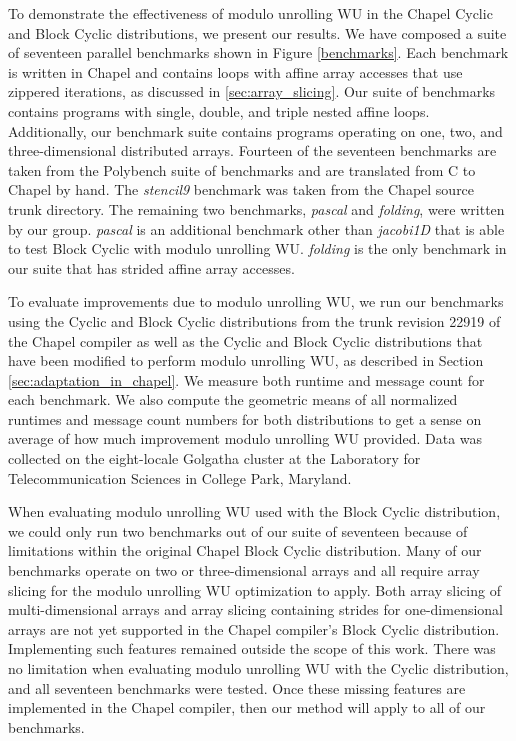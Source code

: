 To demonstrate the effectiveness of modulo unrolling WU in the Chapel Cyclic and Block Cyclic distributions, we present our results. We have composed a suite of seventeen parallel benchmarks shown in Figure \ref{benchmarks}. Each benchmark is written in Chapel and contains loops with affine array accesses that use zippered iterations, as discussed in \ref{sec:array_slicing}. Our suite of benchmarks contains programs with single, double, and triple nested affine loops. Additionally, our benchmark suite contains programs operating on one, two, and three-dimensional distributed arrays. Fourteen of the seventeen benchmarks are taken from the Polybench suite of benchmarks \cite{polybench} and are translated from C to Chapel by hand. The \textit{stencil9} benchmark was taken from the Chapel source trunk directory. The remaining two benchmarks, \textit{pascal} and \textit{folding}, were written by our group. \textit{pascal} is an additional benchmark other than \textit{jacobi1D} that is able to test Block Cyclic with modulo unrolling WU. \textit{folding} is the only benchmark in our suite that has strided affine array accesses. 

To evaluate improvements due to modulo unrolling WU, we run our benchmarks using the Cyclic and Block Cyclic distributions from the trunk revision 22919 of the Chapel compiler as well as the Cyclic and Block Cyclic distributions that have been modified to perform modulo unrolling WU, as described in Section \ref{sec:adaptation_in_chapel}. We measure both runtime and message count for each benchmark. We also compute the geometric means of all normalized runtimes and message count numbers for both distributions to get a sense on average of how much improvement modulo unrolling WU provided. Data was collected on the eight-locale Golgatha cluster at the Laboratory for Telecommunication Sciences in College Park, Maryland. 

When evaluating modulo unrolling WU used with the Block Cyclic distribution, we could only run two benchmarks out of our suite of seventeen because of limitations within the original Chapel Block Cyclic distribution. Many of our benchmarks operate on two or three-dimensional arrays and all require array slicing for the modulo unrolling WU optimization to apply. Both array slicing of multi-dimensional arrays and array slicing containing strides for one-dimensional arrays are not yet supported in the Chapel compiler's Block Cyclic distribution. Implementing such features remained outside the scope of this work. There was no limitation when evaluating modulo unrolling WU with the Cyclic distribution, and all seventeen benchmarks were tested. Once these missing features are implemented in the Chapel compiler, then our method will apply to all of our benchmarks.

